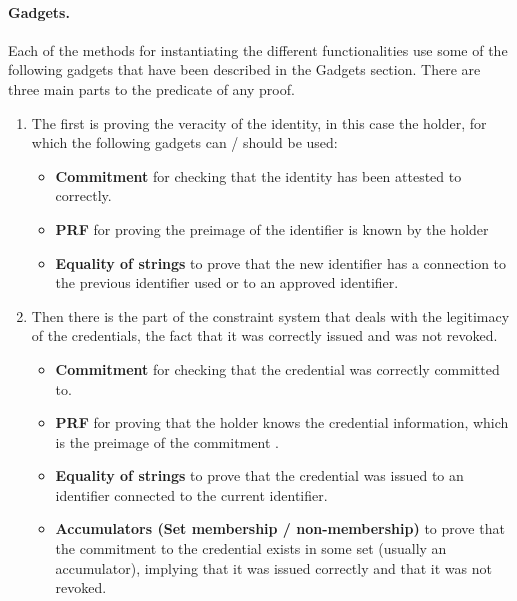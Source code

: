 
\paragraph{Gadgets.}

Each of the methods for instantiating the different functionalities use some of the following gadgets that have been described in the Gadgets section. There are three main parts to the predicate of any proof.
\begin{enumerate}
\item The first is proving the veracity of the identity, in this case the holder, for which the following gadgets can / should be used:
		\begin{itemize}
		\item \textbf{Commitment} for checking that the identity has been attested 			to correctly.
		\item \textbf{PRF} for proving the preimage of the identifier is known by the holder
		\item \textbf{Equality of strings} to prove that the new identifier has a connection to the previous identifier used or to an approved identifier.\
		\end{itemize}

\item Then there is the part of the constraint system that deals with the legitimacy of the credentials, the fact that it was correctly issued and was not revoked. 	
		\begin{itemize}
		\item \textbf{Commitment} for checking that the credential was correctly committed to.	
		\item \textbf{PRF} for proving that the holder knows the credential information, which is the preimage of the commitment .
		\item \textbf{Equality of strings} to prove that the credential was issued to an identifier connected to the current identifier.
		\item \textbf{Accumulators (Set membership / non-membership)} to prove that the commitment to the credential exists in some set (usually an accumulator), implying that it was issued correctly and that it was not revoked.
		\end{itemize}


\end{enumerate}

